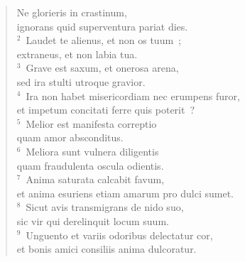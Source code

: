 \begin{flushleft}\begin{verse}\vspace{-19pt}\hspace{6pt}Ne glorieris in crastinum,\\\hspace{6pt} ignorans quid superventura pariat dies.\\
${}^{2}$~Laudet te alienus, et non os tuum~;\\ extraneus, et non labia tua.\\
${}^{3}$~Grave est saxum, et onerosa arena,\\ sed ira stulti utroque gravior.\\
${}^{4}$~Ira non habet misericordiam nec erumpens furor,\\ et impetum concitati ferre quis poterit~?\\
${}^{5}$~Melior est manifesta correptio\\ quam amor absconditus.\\
${}^{6}$~Meliora sunt vulnera diligentis\\ quam fraudulenta oscula odientis.\\
${}^{7}$~Anima saturata calcabit favum,\\ et anima esuriens etiam amarum pro dulci sumet.\\
${}^{8}$~Sicut avis transmigrans de nido suo,\\ sic vir qui derelinquit locum suum.\\
${}^{9}$~Unguento et variis odoribus delectatur cor,\\ et bonis amici consiliis anima dulcoratur.\end{verse}\end{flushleft}


